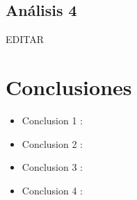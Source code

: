\documentclass[preprint,12pt]{elsarticle}
\begin{document}
\subsection{\textbf{Análisis 4}}
EDITAR\\




\section{Conclusiones}

\begin{itemize}

\item Conclusion 1 : \\

\item Conclusion 2 : \\ 

\item Conclusion 3 : \\ 

\item Conclusion 4 : \\ 
\end{itemize}


	
	\newpage
	
		 
	
	
\end{document}
